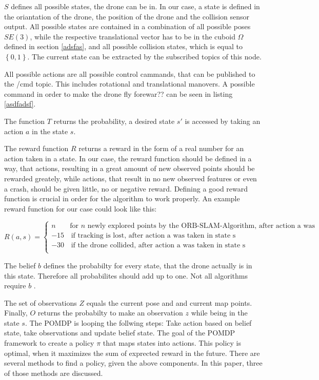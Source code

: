 	$S$ defines all possible states, the drone can be in. In our case, a state is defined in the oriantation of the drone, the position of the drone and the collision sensor output.
	All possible states are contained in a combination of all possible poses $SE(3)$, while the respective translational vector has to be in the cuboid $\Omega$ defined in section \ref{adsfas},  
	and all possible collision states, which is equal to $\left\{0,1\right\}$. The current state can be extracted by the subscribed topics of this node. 
	
	All possible actions are all possible control cammands, that can be published to the /cmd topic. This includes rotational and translational manovers. A possible 
	command in order to make the drone fly forewar?? can be seen in listing \ref{asdfadsf}. 
	
	The function $T$ returns the probability, a desired state $s'$ is accessed by taking an action $a$ in the state $s$. 
	
	The reward function $R$ returns a reward in the form of a real number for an action taken in a state. In our case, the reward function should be defined in a way, that actions, resulting 
	in a great amount of new observed points should be rewarded greately, while actions, that result in no new observed features or even a crash, should be given little, no or negative reward. 
	Defining a good reward function is crucial in order for the algorithm to work properly. An example reward function for our case could look like this: 
	
	$$R(a,s) = \left\{
\begin{array}{ll}
n & \textrm{for } n \textrm{ newly explored points by the ORB-SLAM-Algorithm, after action a was taken in state s} \\
-15 & \, \textrm{if tracking is lost, after action a was taken in state s}  \\
-30 & \, \textrm{if the drone collided, after action a was taken in state s}  \\
\end{array}
\right. $$
	
	The belief $b$ defines the probabilty for every state, that the drone actually is in this state. Therefore all probabilites should add up to one. Not all algorithms 
	require $b$ \cite{belief}.
	
	The set of observations $Z$ equals the current pose and and current map points. Finally, $O$ returns the probabilty to make an observation $z$ while being in the state $s$.
	The POMDP is looping the follwing steps: Take action based on belief state, take observations and update belief state. The goal of the POMDP framework to 
	create a policy $\pi$ that maps states into actions. This policy is optimal, when it maximizes the sum of exprected reward in the future. There are several 
	methods to find a policy, given the above components. In this paper, three of those methods are discussed. 
	

